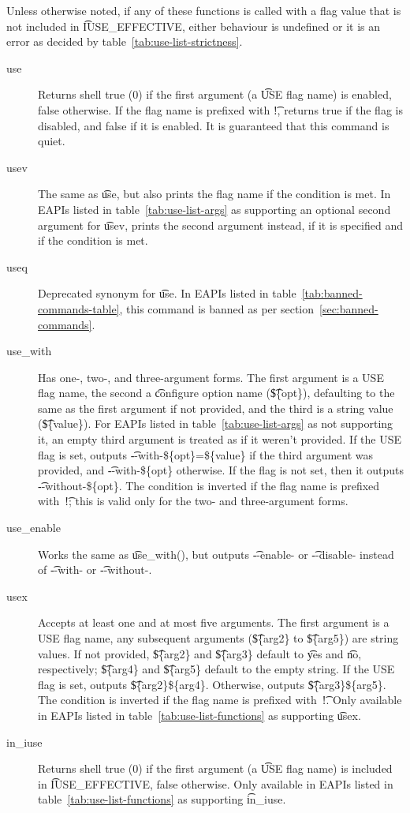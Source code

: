 Unless otherwise noted, if any of these functions is called with a flag value that is not included
in \t{IUSE_EFFECTIVE}, either behaviour is undefined or it is an error as decided by
table~\ref{tab:use-list-strictness}.

\begin{description}
\item[use] Returns shell true (0) if the first argument (a \t{USE} flag name) is enabled, false
    otherwise.  If the flag name is prefixed with \t{!}, returns true if the flag is disabled, and
    false if it is enabled. It is guaranteed that this command is quiet.
\item[usev]  The same as \t{use}, but also prints the flag name if the condition
    is met. In EAPIs listed in table~\ref{tab:use-list-args} as supporting an optional second
    argument for \t{usev}, prints the second argument instead, if it is specified and if the
    condition is met.
\item[useq] Deprecated synonym for \t{use}.
    In EAPIs listed in table~\ref{tab:banned-commands-table}, this command is banned as per
    section~\ref{sec:banned-commands}.
\item[use_with]  Has one-, two-, and three-argument forms. The first
    argument is a USE flag name, the second a \t{configure} option name (\t{\$\{opt\}}), defaulting
    to the same as the first argument if not provided, and the third is a string value
    (\t{\$\{value\}}). For EAPIs listed in table~\ref{tab:use-list-args} as not supporting it,
    an empty third argument is treated as if it weren't provided. If the USE flag is set, outputs
    \t{-{}-with-\$\{opt\}=\$\{value\}} if the third argument was provided, and
    \t{-{}-with-\$\{opt\}} otherwise. If the flag is not set, then it outputs
    \t{-{}-without-\$\{opt\}}. The condition is inverted if the flag name is prefixed with~\t{!};
    this is valid only for the two- and three-argument forms.
\item[use_enable] Works the same as \t{use_with()}, but outputs \t{-{}-enable-} or
    \t{-{}-disable-} instead of \t{-{}-with-} or \t{-{}-without-}.
\item[usex]  Accepts at least one and at most five arguments. The first argument
    is a USE flag name, any subsequent arguments (\t{\$\{arg2\}} to \t{\$\{arg5\}}) are string
    values. If not provided, \t{\$\{arg2\}} and \t{\$\{arg3\}} default to \t{yes} and \t{no},
    respectively; \t{\$\{arg4\}} and \t{\$\{arg5\}} default to the empty string. If the USE flag is
    set, outputs \t{\$\{arg2\}\$\{arg4\}}. Otherwise, outputs \t{\$\{arg3\}\$\{arg5\}}.
    The condition is inverted if the flag name is prefixed with~\t{!}.
    Only available in EAPIs listed in table~\ref{tab:use-list-functions} as supporting \t{usex}.
\item[in_iuse]  Returns shell true (0) if the first argument (a \t{USE} flag
    name) is included in \t{IUSE_EFFECTIVE}, false otherwise. Only available in EAPIs listed in
    table~\ref{tab:use-list-functions} as supporting \t{in_iuse}.
\end{description}

